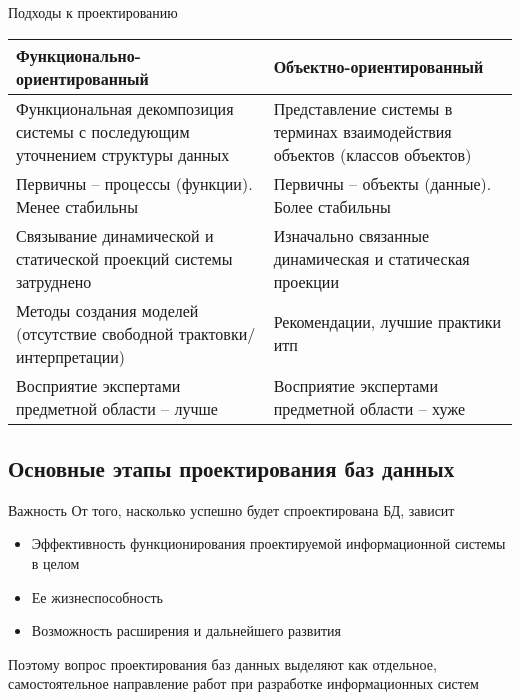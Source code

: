 \documentclass[12pt]{article}
\begin{document}
\begin{nota}{Подходы к проектированию}
    \begin{center}
        \begin{tabular}{|m{17.5em}|m{17.5em}|}
            \hline
            Функционально-ориентированный & Объектно-ориентированный \\
            \hline
            Функциональная декомпозиция системы с последующим уточнением структуры данных & Представление системы в терминах взаимодействия объектов (классов объектов) \\
            \hline
            Первичны -- процессы (функции). Менее стабильны & Первичны -- объекты (данные). Более стабильны \\
            \hline
            Связывание динамической и статической проекций системы затруднено & Изначально связанные динамическая и статическая проекции \\
            \hline
            Методы создания моделей (отсутствие свободной трактовки/интерпретации) & Рекомендации, лучшие практики итп \\ 
            \hline
            Восприятие экспертами предметной области -- лучше & Восприятие экспертами предметной области -- хуже \\
            \hline
        \end{tabular}
    \end{center}
\end{nota}

\newpage

\subsection{Основные этапы проектирования баз данных}

\begin{nota}{Важность}
    От того, насколько успешно будет спроектирована БД, зависит 

    \begin{itemize}
        \item Эффективность функционирования проектируемой информационной системы в целом 
        \item Ее жизнеспособность
        \item Возможность расширения и дальнейшего развития 
    \end{itemize}

    Поэтому вопрос проектирования баз данных выделяют как отдельное, самостоятельное направление работ при разработке информационных систем 
\end{nota}
\end{document}
